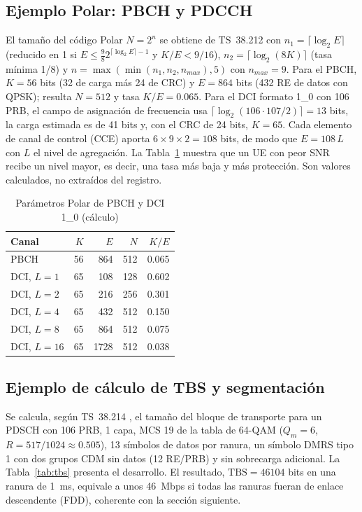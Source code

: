 \documentclass[conference]{IEEEtran}
\begin{document}
\subsection{Ejemplo Polar: PBCH y PDCCH}
El tamaño del código Polar $N=2^n$ se obtiene de TS~38.212 \cite{ts38212} con $n_1=\lceil\log_2 E\rceil$ (reducido en 1 si $E\le\tfrac98 2^{\lceil\log_2E\rceil-1}$ y $K/E<9/16$), $n_2=\lceil\log_2(8K)\rceil$ (tasa mínima 1/8) y $n=\max(\min(n_1,n_2,n_{max}),5)$ con $n_{max}=9$. Para el PBCH, $K=56$ bits (32 de carga más 24 de CRC) y $E=864$ bits (432 RE de datos con QPSK); resulta $N=512$ y tasa $K/E=0.065$. Para el DCI formato 1\_0 con 106 PRB, el campo de asignación de frecuencia usa $\lceil\log_2(106\cdot107/2)\rceil=13$ bits, la carga estimada es de 41 bits y, con el CRC de 24 bits, $K=65$. Cada elemento de canal de control (CCE) aporta $6\times9\times2=108$ bits, de modo que $E=108\,L$ con $L$ el nivel de agregación. La Tabla~\ref{tab:polar} muestra que un UE con peor SNR recibe un nivel mayor, es decir, una tasa más baja y más protección. Son valores calculados, no extraídos del registro.

\begin{table}[!t]
\caption{Parámetros Polar de PBCH y DCI 1\_0 (cálculo)}
\label{tab:polar}
\centering
\footnotesize
\renewcommand{\arraystretch}{1.1}
\begin{tabular}{lrrrr}
\toprule
\textbf{Canal} & $K$ & $E$ & $N$ & $K/E$ \\
\midrule
PBCH & 56 & 864 & 512 & 0.065 \\
DCI, $L=1$ & 65 & 108 & 128 & 0.602 \\
DCI, $L=2$ & 65 & 216 & 256 & 0.301 \\
DCI, $L=4$ & 65 & 432 & 512 & 0.150 \\
DCI, $L=8$ & 65 & 864 & 512 & 0.075 \\
DCI, $L=16$ & 65 & 1728 & 512 & 0.038 \\
\bottomrule
\end{tabular}
\end{table}

\subsection{Ejemplo de cálculo de TBS y segmentación}
Se calcula, según TS~38.214 \cite{ts38214}, el tamaño del bloque de transporte para un PDSCH con 106 PRB, 1 capa, MCS 19 de la tabla de 64-QAM ($Q_m=6$, $R=517/1024\approx0.505$), 13 símbolos de datos por ranura, un símbolo DMRS tipo 1 con dos grupos CDM sin datos (12 RE/PRB) y sin sobrecarga adicional. La Tabla~\ref{tab:tbs} presenta el desarrollo. El resultado, $\mathrm{TBS}=46104$ bits en una ranura de 1~ms, equivale a unos 46~Mbps si todas las ranuras fueran de enlace descendente (FDD), coherente con la sección siguiente.
\end{document}
